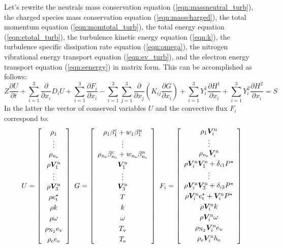 \documentclass{warpdoc}
\newcommand{\alb}{\vspace{0.1cm}\\} %
\newcommand{\ns}{{n_{\rm s}}}
\renewcommand{\vec}[1]{\bm{#1}}
\begin{document}
Let's rewrite the neutrals mass conservation equation (\ref{eqn:massneutral_turb}), the charged species mass conservation equation (\ref{eqn:masscharged}), the total momentum equation (\ref{eqn:momtotal_turb}), the total energy equation (\ref{eqn:etotal_turb}), the turbulence kinetic energy equation (\ref{eqn:k}), the turbulence specific dissipation rate equation (\ref{eqn:omega}), the nitrogen vibrational energy transport equation (\ref{eqn:ev_turb}), and the electron energy transport equation (\ref{eqn:eenergy}) in matrix form. This can be accomplished as follows:
%
\begin{equation}
   Z\frac{\partial U}{\partial t} + \sum_{i=1}^3  \frac{\partial }{\partial x_i} D_i U
   + \sum_{i=1}^3 \frac{\partial F_i}{\partial x_i} 
     - \sum_{i=1}^3 \sum_{j=1}^3 \frac{\partial }{\partial x_j}\left( K_{ij} \frac{\partial G}{\partial x_i} \right)
     +\sum_{i=1}^3 Y_i^1 \frac{\partial H^1}{\partial x_i}  
     +\sum_{i=1}^3 Y_i^2 \frac{\partial H^2}{\partial x_i}  
   =S
\end{equation}
%
In the latter the vector of conserved variables $U$ and the convective flux $F_i$ correspond to:
%
\begin{equation}
U = \left[\begin{array}{c}
    \rho_1 \\
    \vdots \\
    \rho_\ns \alb
    \rho \vec{V}^{\rm n}_1 \\
    \vdots \\
    \rho \vec{V}^{\rm n}_3 \alb
    \rho e_{\rm t}^\star \alb
    \rho k \alb
    \rho \omega \alb
    \rho_{\rm N_2} e_{\rm v} \alb
    \rho_{\rm e} e_{\rm e} \end{array}\right]
~
G = \left[ \begin{array}{c}
    \rho_1 \beta^{\rm c}_1 + w_1 \beta^{\rm n}_1 \\
    \vdots \\
    \rho_\ns \beta^{\rm c}_\ns + w_\ns \beta^{\rm n}_\ns \alb
    \vec{V}_1^{\rm n} \\
    \vdots\\
    \vec{V}_3^{\rm n} \alb
    T \alb
    k \alb
    \omega \alb
    T_{\rm v} \alb
    T_{\rm e}
\end{array}
\right]
~
F_i = \left[ \begin{array}{c}
    \rho_1 \vec{V}^{\rm n}_i \\
    \vdots\\
    \rho_\ns \vec{V}^{\rm n}_i \alb
    \rho\vec{V}_i^{\rm n} \vec{V}_1^{\rm n} + \delta_{i1} P^\star \\
    \vdots \\
    \rho\vec{V}_i^{\rm n} \vec{V}_3^{\rm n}  + \delta_{i3} P^\star \alb
    \rho \vec{V}^{\rm n}_i e_{\rm t}^\star + \vec{V}^{\rm n}_i P^\star \alb
    \rho \vec{V}^{\rm n}_i k \alb
    \rho \vec{V}^{\rm n}_i \omega \alb
    \rho_{\rm N_2} \vec{V}^{\rm n}_i e_{\rm v} \alb
    \rho_{\rm e} \vec{V}^{\rm n}_i h_{\rm e} \alb
\end{array}\right]
\end{equation}
\end{document}
